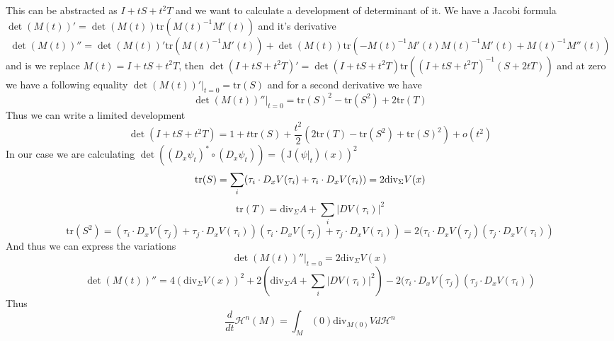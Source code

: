 This can be abstracted as $I+tS+t^2T$ and we want to calculate a development
of determinant of it. We have a Jacobi formula $\det(M(t))'=\det(M(t))\text{tr}
(M(t)^{-1}M'(t))$ and it's derivative
\[\det(M(t))''=\det(M(t))'\text{tr}(M(t)^{-1}M'(t))+\det(M(t))\text{tr}(-M(t)^
{-1}M'(t)M(t)^{-1}M'(t)+M(t)^{-1}M''(t))\]
and is we replace $M(t)=I+tS+t^2T$, then $\det(I+tS+t^2T)'=\det(I+tS+t^2T)\text{tr}
((I+tS+t^2T)^{-1}(S+2tT))$ and at zero we have a following equality
$\det(M(t))'|_{t=0}=\text{tr}(S)$ and for a second derivative we have
\[\det(M(t))''|_{t=0}=\text{tr}(S)^2-\text{tr}(S^2)+2\text{tr}(T)\]
Thus we can write a limited development
\[\det(I+tS+t^2T)=1+t\text{tr}(S)+\frac{t^2}{2}(2\text{tr}(T)-\text{tr}(S^2)+\text{tr}(S)^2)+o(t^2)\]
In our case we are calculating $\det((D_x\psi_t)^*\circ(D_x\psi_t))=(\text{J}(\psi|_t)(x))^2$
\[
    \text{tr}(S)=\sum_i(\tau_i\cdot D_xV(\tau_i)+\tau_i\cdot D_xV(\tau_i))=2\text{div}_\Sigma V(x)\\
\]
\[
    \text{tr}(T)=\text{div}_\Sigma A+\sum_i|DV(\tau_i)|^2
\]
\[
    \text{tr}(S^2)=(\tau_i\cdot D_xV(\tau_j)+\tau_j\cdot D_xV(\tau_i))(\tau_i\cdot D_xV(\tau_j)+\tau_j\cdot D_xV(\tau_i))
    =2(\tau_i\cdot D_xV(\tau_j)(\tau_j\cdot D_xV(\tau_i))
\]
And thus we can express the variations
\[\det(M(t))''|_{t=0}=2\text{div}_\Sigma V(x)\]
\[\det(M(t))''=4(\text{div}_\Sigma V(x))^2+2(\text{div}_\Sigma A+\sum_i|DV(\tau_i)|^2)-2(\tau_i\cdot D_xV(\tau_j)(\tau_j\cdot D_xV(\tau_i))\]
Thus
\[\frac{d}{dt}\mathcal H^n(M)=\int_M(0)\text{div}_{M(0)}Vd\mathcal H^n\]
